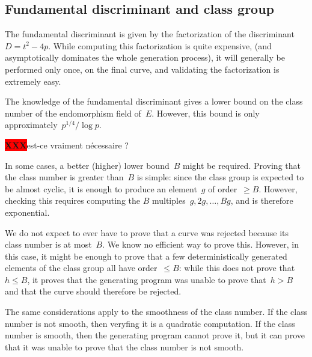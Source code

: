 \documentclass{article}
\def\XXX{{\colorbox{red}{{\color{white}\bfseries XXX}}}}
\begin{document}
\subsection{Fundamental discriminant and class group}

The fundamental discriminant is given by
the factorization of the discriminant~$D = t^2 - 4 p$.
While computing this factorization is quite expensive,
(and asymptotically dominates the whole generation process),
it will generally be performed only once, on the final curve,
and validating the factorization is extremely easy.

The knowledge of the fundamental discriminant gives a lower bound
on the class number of the endomorphism field of~$E$.
However, this bound is only approximately~$p^{1/4}/\log p$.

\smallskip

\XXX est-ce vraiment nécessaire ?

In some cases, a better (higher) lower bound~$B$ might be required.
Proving that the class number is greater than~$B$ is simple:
since the class group is expected to be almost cyclic,
it is enough to produce an element~$g$ of order~$≥ B$.
However, checking this requires
computing the $B$ multiples~$g, 2g, …, B g$,
and is therefore exponential.

We do not expect to ever have to prove that a curve was rejected
because its class number is at most~$B$.
We know no efficient way to prove this.
However, in this case, it might be enough to prove
that a few deterministically generated elements of the class group
all have order~$≤ B$:
while this does not prove that~$h ≤ B$,
it proves that the generating program was unable to prove that~$h > B$
and that the curve should therefore be rejected.

\smallskip

The same considerations apply to the smoothness of the class number.
If the class number is not smooth, then
veryfing it is a quadratic computation.
If the class number is smooth, then
the generating program cannot prove it,
but it can prove that it was unable to prove that
the class number is not smooth.



\end{document}
